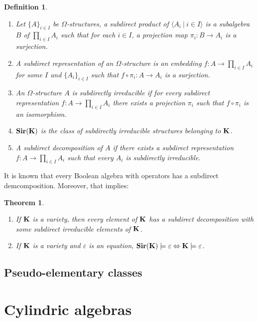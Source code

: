 \documentclass[a4paper]{article}
\theoremstyle{defin}
\newtheorem{defin}{Definition}
\theoremstyle{theorem}
\newtheorem{theorem}{Theorem}
\theoremstyle{prop}
\theoremstyle{lemma}
\theoremstyle{ex}
\theoremstyle{col}
\begin{document}
\begin{defin}
  $ $

  \begin{enumerate}
    \item Let $\{ A \}_{i \in I}$ be $\Omega$-structures, a subdirect product of $\langle A_i \: | \: i \in I \rangle$ is a
    subalgebra $B$ of $\prod \limits_{i \in I} A_i$ such that for each $i \in I$, a projection map $\pi_i : B \to A_i$ is a surjection.
    \item A subdirect representation of an $\Omega$-structure is an embedding $f : A \to \prod \limits_{i \in I} A_i$ for some $I$ and
    $\{ A_i \}_{i \in I}$ such that $f \circ \pi_i : A \to A_i$ is a surjection.
    \item An $\Omega$-structure $A$ is subdirectly irreducible if for every subdirect representation $f : A \to \prod \limits_{i \in I} A_i$
    there exists a projection $\pi_i$ such that $f \circ \pi_i$ is an isomorphism.
    \item ${\bf Sir}({\bf K})$ is the class of subdirectly irreducible structures belonging to ${\bf K}$.
    \item A subdirect decomposition of $A$ if there exists a subdirect representation $f : A \to \prod \limits_{i \in I} A_i$ such that
    every $A_i$ is subdirectly irreducible.
  \end{enumerate}
\end{defin}

It is known that every Boolean algebra with operators has a subdirect demcomposition. Moreover, that implies:
\begin{theorem}
$ $

  \begin{enumerate}
  \item If ${\bf K}$ is a variety, then every element of ${\bf K}$ has a subdirect decomposition with some subdirect irreducible elements of
  ${\bf K}$.
  \item If ${\bf K}$ is a variety and $\varepsilon$ is an equation,
  ${\bf Sir}({\bf K}) \models \varepsilon \Leftrightarrow {\bf K} \models \varepsilon$.
\end{enumerate}
\end{theorem}

\subsection{Pseudo-elementary classes}

\section{Cylindric algebras}
\end{document}
